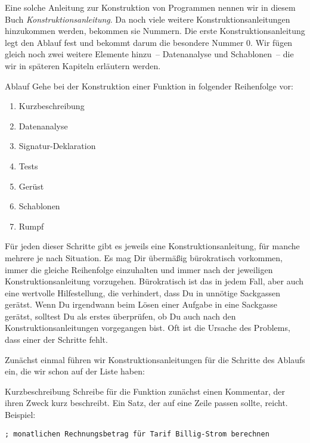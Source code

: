 Eine solche Anleitung zur Konstruktion von Programmen nennen wir in
diesem Buch
\textit{Konstruktionsanleitung}.  Da
noch viele weitere Konstruktionsanleitungen hinzukommen werden,
bekommen sie Nummern.  Die erste Konstruktionsanleitung legt den
Ablauf fest und bekommt darum die besondere Nummer 0.
Wir fügen gleich noch zwei weitere Elemente
hinzu~-- Datenanalyse und Schablonen~-- die wir in späteren Kapiteln
erläutern werden.

\setcounter{xkonstruktionsanleitung}{-1}

\begin{konstruktionsanleitung}{Ablauf}
  Gehe bei der Konstruktion einer Funktion in folgender Reihenfolge
  vor:
  \begin{enumerate}
    \item Kurzbeschreibung
    \item Datenanalyse
    \item Signatur-Deklaration
    \item Tests
    \item Gerüst
    \item Schablonen
    \item Rumpf
    \end{enumerate}
\end{konstruktionsanleitung}
%
Für jeden dieser Schritte gibt es jeweils eine Konstruktionsanleitung,
für manche mehrere je nach Situation.  Es mag Dir übermäßig
bürokratisch vorkommen, immer die gleiche Reihenfolge einzuhalten und
immer nach der jeweiligen Konstruktionsanleitung vorzugehen.
Bürokratisch ist das in jedem Fall, aber auch eine wertvolle
Hilfestellung, die verhindert, dass Du in unnötige Sackgassen
gerätst.  Wenn Du irgendwann beim Lösen einer Aufgabe in
eine Sackgasse gerätst, solltest Du als erstes überprüfen, ob Du auch
nach den Konstruktionsanleitungen vorgegangen bist.  Oft ist die
Ursache des Problems, dass einer der Schritte fehlt.

Zunächst einmal führen wir Konstruktionsanleitungen für die Schritte
des Ablaufs ein, die wir schon auf der Liste haben:

\begin{konstruktionsanleitung}{Kurzbeschreibung}
  \label{ka:kurzbeschreibung}
  Schreibe für die Funktion zunächst einen Kommentar, der ihren Zweck
  kurz beschreibt.  Ein Satz, der auf eine Zeile passen sollte,
  reicht.  Beispiel:
\begin{lstlisting}
; monatlichen Rechnungsbetrag für Tarif Billig-Strom berechnen
\end{lstlisting}
\end{konstruktionsanleitung}

